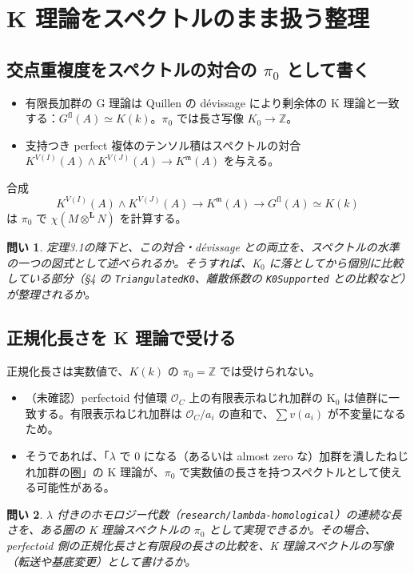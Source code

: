 \documentclass[11pt,a4paper]{ltjsarticle}
\theoremstyle{plain}
\newtheorem{question}{問い}
\theoremstyle{definition}
\theoremstyle{remark}
\newcommand{\m}{\mathfrak{m}}
\newcommand{\Z}{\mathbb{Z}}
\newcommand{\Lotimes}{\otimes^{\mathbf{L}}}
\begin{document}
\section{K 理論をスペクトルのまま扱う整理}

\subsection{交点重複度をスペクトルの対合の $\pi_0$ として書く}

\begin{itemize}
  \item 有限長加群の G 理論は Quillen の dévissage により剰余体の K 理論と一致する：$G^{\mathrm{fl}}(A) \simeq K(k)$。$\pi_0$ では長さ写像 $K_0 \to \Z$。
  \item 支持つき perfect 複体のテンソル積はスペクトルの対合 $K^{V(I)}(A) \wedge K^{V(J)}(A) \to K^{\m}(A)$ を与える。
\end{itemize}
合成
\[
  K^{V(I)}(A) \wedge K^{V(J)}(A) \longrightarrow K^{\m}(A) \longrightarrow G^{\mathrm{fl}}(A) \simeq K(k)
\]
は $\pi_0$ で $\chi(M \Lotimes N)$ を計算する。
\begin{question}
定理3.1の降下と、この対合・dévissage との両立を、スペクトルの水準の一つの図式として述べられるか。そうすれば、K$_0$ に落としてから個別に比較している部分（§4 の \texttt{TriangulatedK0}、離散係数の \texttt{K0Supported} との比較など）が整理されるか。
\end{question}

\subsection{正規化長さを K 理論で受ける}

正規化長さは実数値で、$K(k)$ の $\pi_0 = \Z$ では受けられない。
\begin{itemize}
  \item （未確認）perfectoid 付値環 $\mathcal{O}_C$ 上の有限表示ねじれ加群の K$_0$ は値群に一致する。有限表示ねじれ加群は $\mathcal{O}_C/a_i$ の直和で、$\sum v(a_i)$ が不変量になるため。
  \item そうであれば、「$\lambda$ で 0 になる（あるいは almost zero な）加群を潰したねじれ加群の圏」の K 理論が、$\pi_0$ で実数値の長さを持つスペクトルとして使える可能性がある。
\end{itemize}
\begin{question}
$\lambda$ 付きのホモロジー代数（\texttt{research/lambda-homological}）の連続な長さを、ある圏の K 理論スペクトルの $\pi_0$ として実現できるか。その場合、perfectoid 側の正規化長さと有限段の長さの比較を、K 理論スペクトルの写像（転送や基底変更）として書けるか。
\end{question}
\end{document}
